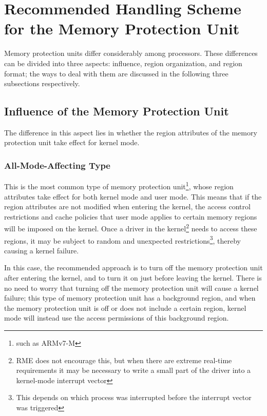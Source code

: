 \section{Recommended Handling Scheme for the Memory Protection Unit}\label{sec:9-mpu-recommendations}

Memory protection units differ considerably among processors. These differences can be divided into three aspects: influence, region organization, and region format; the ways to deal with them are discussed in the following three subsections respectively.

\subsection{Influence of the Memory Protection Unit}\label{subsec:9-mpu-influence}

The difference in this aspect lies in whether the region attributes of the memory protection unit take effect for kernel mode.

\subsubsection{All-Mode-Affecting Type}\label{subsubsec:9-mpu-all-mode-affecting}

This is the most common type of memory protection unit\footnote{such as ARMv7-M}, whose region attributes take effect for both kernel mode and user mode. This means that if the region attributes are not modified when entering the kernel, the access control restrictions and cache policies that user mode applies to certain memory regions will be imposed on the kernel. Once a driver in the kernel\footnote{RME does not encourage this, but when there are extreme real-time requirements it may be necessary to write a small part of the driver into a kernel-mode interrupt vector} needs to access these regions, it may be subject to random and unexpected restrictions\footnote{This depends on which process was interrupted before the interrupt vector was triggered}, thereby causing a kernel failure.

In this case, the recommended approach is to turn off the memory protection unit after entering the kernel, and to turn it on just before leaving the kernel. There is no need to worry that turning off the memory protection unit will cause a kernel failure; this type of memory protection unit has a background region, and when the memory protection unit is off or does not include a certain region, kernel mode will instead use the access permissions of this background region.

